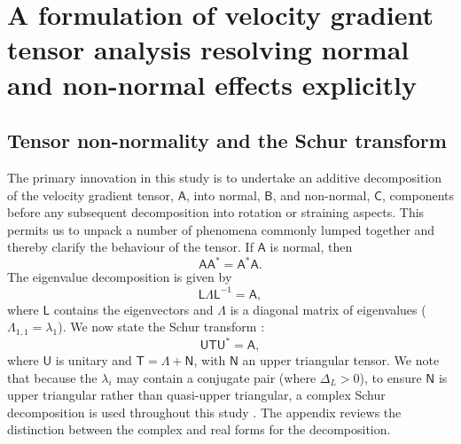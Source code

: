 \documentclass[preprint,amssymb,amsmath,aip,cha]{revtex4-1}
\begin{document}
\section{A formulation of velocity gradient tensor analysis resolving normal and non-normal effects explicitly}
\subsection{Tensor non-normality and the {S}chur transform}
The primary innovation in this study is to undertake an additive decomposition of the velocity gradient tensor, $\mathsf{A}$, into normal, $\mathsf{B}$, and non-normal, $\mathsf{C}$, components before any subsequent decomposition into rotation or straining aspects. This permits us to unpack a number of phenomena commonly lumped together and thereby clarify the behaviour of the tensor. If $\mathsf{A}$ is normal, then 
\begin{equation}
\mathsf{A}\mathsf{A}^{*} = \mathsf{A}^{*}\mathsf{A}.
\label{eq.norm}
\end{equation} 
The eigenvalue decomposition is given by 
\begin{equation}
\mathsf{L}\mathsf{\Lambda}\mathsf{L}^{-1} = \mathsf{A},
\label{eq.eig} 
\end{equation}
where $\mathsf{L}$ contains the eigenvectors and $\mathsf{\Lambda}$ is a diagonal matrix of eigenvalues ($\Lambda_{1,1} = \lambda_{1}$). We now state the Schur transform \citep{schur1909}:
\begin{equation}
\mathsf{U}\mathsf{T}\mathsf{U}^{*} = \mathsf{A},
\label{eq.schur}
\end{equation}
where $\mathsf{U}$ is unitary and $\mathsf{T} = \mathsf{\Lambda} + \mathsf{N}$, with $\mathsf{N}$ an upper triangular tensor. We note that because the $\lambda_{i}$ may contain a conjugate pair (where $\Delta_{L} > 0$), to ensure $\mathsf{N}$ is upper triangular rather than quasi-upper triangular, a complex Schur decomposition is used throughout this study \citep{GolubVanLoan13}. The appendix reviews the distinction between the complex and real forms for the decomposition. 
\end{document}
